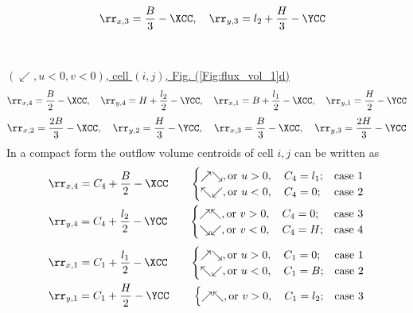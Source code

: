 \documentclass[fleqn]{article}
\begin{document}
{\[    \quad                              
    \rr_{x,3} = \frac{B}{3} - \XCC,            \quad   \rr_{y,3} = l_2 + \frac{H}{3} - \YCC\]
%
%
%
\\
\\
\underline{$(\swarrow, u < 0, v < 0)$, cell $(i, j)$, Fig. (\ref{Fig:flux_vol_1}d)}
\\
%
%
\[  \rr_{x,4} = \frac{B}{2} - \XCC,         \quad   \rr_{y,4} = H + \frac{l_2}{2} - \YCC,   
    \quad
    \rr_{x,1} = B + \frac{l_1}{2} - \XCC,   \quad   \rr_{y,1} = \frac{H}{2} - \YCC \]
%
%
\[  \rr_{x,2} = \frac{2B}{3} - \XCC,        \quad   \rr_{y,2} = \frac{H}{3} - \YCC,
    \quad                              
    \rr_{x,3} = \frac{B}{3} - \XCC,         \quad   \rr_{y,3} = \frac{2H}{3} - \YCC\]
%
%
In a compact form the outflow volume centroids of cell $i, j$ can be written as
\begin{alignat}{3}
    &\rr_{x,4} = C_4 + \frac{B}{2} - \XCC           \quad&
    \begin{cases}
        \nearrow \searrow, \text{or}~u >0,  \quad   C_4 = l_1;     &   \text{case 1}   
 \\
        \nwarrow \swarrow, \text{or}~u <0,  \quad   C_4 = 0;       &   \text{case 2}
    \end{cases}
%
\\
%
    &\rr_{y,4} = C_4 + \frac{l_2}{2} - \YCC         \quad&
    \begin{cases}
        \nearrow \nwarrow, \text{or}~v >0,   \quad   C_4 = 0;      &   \text{case 3} 
 \\
        \searrow \swarrow, \text{or}~v <0,   \quad   C_4 = H;      &   \text{case 4}
    \end{cases}
\end{alignat}
%
%
\begin{alignat}{3}
    &\rr_{x,1} = C_1 + \frac{l_1}{2} - \XCC         \quad&
    \begin{cases}
        \nearrow \searrow, \text{or}~u >0,  \quad   C_1 = 0;       &   \text{case 1}   
 \\
        \nwarrow \swarrow, \text{or}~u <0,  \quad   C_1 = B;       &   \text{case 2}
    \end{cases}
%
\\
%
    &\rr_{y,1} = C_1 + \frac{H}{2} - \YCC           \quad&
    \begin{cases}
        \nearrow \nwarrow, \text{or}~v >0,   \quad   C_1 = l_2;    &   \text{case 3} 

\end{cases}
\end{alignat}}
\end{document}
